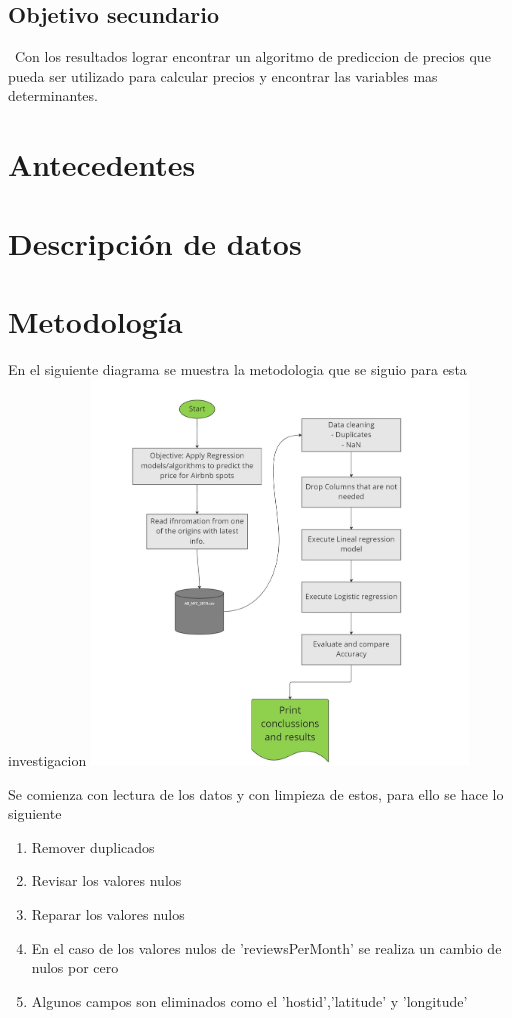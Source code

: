 \documentclass[conference]{IEEEtran}
\begin{document}
\subsection{Objetivo secundario}
 Con los resultados lograr encontrar un algoritmo de prediccion de precios que pueda ser utilizado para calcular precios y encontrar las variables mas determinantes.

\section{Antecedentes}


\section{Descripción de datos}


\section{Metodología}
En el siguiente diagrama se muestra la metodologia que se siguio para esta investigacion
\includegraphics[width=10cm]{images/Metodologia.png}

Se comienza con lectura de los datos y con limpieza de estos, para ello se hace lo siguiente 
\begin{enumerate}
    \item Remover duplicados
    \item Revisar los valores nulos
    \item Reparar los valores nulos 
    \item En el caso de los valores nulos de 'reviewsPerMonth' se realiza un cambio de nulos por cero
    \item Algunos campos son eliminados como el 'hostid','latitude' y 'longitude'
\end{enumerate}
\end{document}

